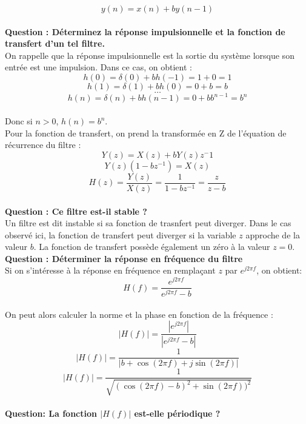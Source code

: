 \documentclass[11pt,a4paper]{article}
\begin{document}
\[ y(n) =  x(n) + b y(n-1)\]\\

\textbf{ Question : Déterminez la réponse impulsionnelle et la fonction de transfert d'un tel filtre.}\\

On rappelle que la réponse impulsionnelle est la sortie du système lorsque son entrée est une impulsion. Dans ce cas, on obtient : \\
\[ h(0) = \delta(0) + b h(-1) = 1 + 0 = 1\]
\[ h(1) = \delta(1) + b h(0) = 0 + b  = b \]
\[ \ldots \]
\[ h(n) = \delta(n) + b h(n-1) = 0 + b b^{n-1} = b^{n}\]\\

Donc si $n > 0$, $h(n) = b^{n}$.\\

Pour la fonction de transfert, on prend la transformée en Z de l'équation de récurrence du filtre : \\

\[ Y(z)  = X(z) + b Y(z) z^-1 \] 
\[ Y(z) (1 -bz^{-1}) =  X(z)  \]
\[ H(z) = \frac{Y(z)}{X(z)} = \frac{1}{1 - b z^{-1}} = \frac{z}{z-b} \]\\

\textbf{ Question : Ce filtre est-il stable ? }\\

Un filtre est dit instable si sa fonction de trasnfert peut diverger. Dans le cas observé ici, la fonction de transfert peut diverger si la variable $z$ approche de la valeur $b$. La fonction de transfert possède également un zéro à la valeur $z = 0$.\\

\textbf{ Question : Déterminer la réponse en fréquence du filtre }\\

Si on s'intéresse à la réponse en fréquence en remplaçant $z$ par $e^{j 2 \pi f}$, on obtient: \\

\[ H(f) =  \frac{e^{j2 \pi f}}{e^{j 2 \pi f}-b} \]\\

On peut alors calculer la norme et la phase en fonction de la fréquence : \\

\[ |H(f)| = \frac{|e^{j2 \pi f}|}{|e^{j 2 \pi f}-b|} \]
\[ |H(f)| = \frac{1}{|b + \cos(2 \pi f) + j \sin(2 \pi f)|} \]
\[ |H(f)| = \frac{1}{\sqrt{(\cos(2 \pi f) - b)^2 +  \sin(2 \pi f))^2}} \]\\

\textbf{Question: La fonction $|H(f)|$ est-elle périodique ?}\\
\end{document}
